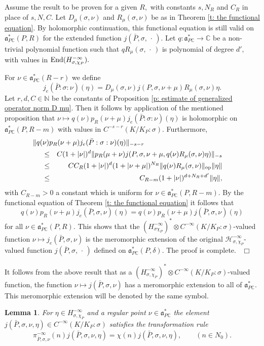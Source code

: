 \documentclass[12pt,a4paper]{article}
\newtheorem{Lemma}[Thm]{Lemma}
\newenvironment{lemma}[0]{\begin{Lemma}\noindent}%
{\end{Lemma}}
\def\qed{~\hfill\hbox{$\Box$}\medbreak}
\def\qquad{\quad\quad}
\def\msy#1{{\mathbb #1}}
\def\C{{\msy C}}
\def\N{{\msy N}}
\def\gd{\delta}
\def\gs{\sigma}
\def\got#1{\mathfrak #1}
\def\fa{{\got a}}
\def\to{\rightarrow}
\def\End{{\rm End}}
\def\iC{{\scriptscriptstyle \C}}
\def\cH{{\mathcal H}}
\numberwithin{Thm}{section}
\numberwithin{equation}{section}
\def\dotvar{\, \cdot\,}
\def\faPdc{{\fa_{P\iC}^*}}
\numberwithin{equation}{section}
\def\faPdc{\fa_{P\iC}^*}
\def\cchi{\chi}
\def\gsP{\gs}%
\begin{document}
Assume the result to be proven for a given $R,$ with constants $s, N_R$ and $C_R$ 
in place of $s, N, C.$ 
Let $D_\mu(\gs, \nu)$ and $R_\mu(\gs, \nu)$ be as in Theorem \ref{t: the functional equation}.
By holomorphic continuation, this functional equation is still valid on $\faPdc(P,R) $
for the extended function $j(\bar P, \gs, \dotvar).$ 
Let $q: \faPdc \to \C$ be a  non-trivial polynomial function such that $q R_\mu(\gs, \dotvar)$ is polynomial
of degree $d',$ with values in $\End (H_{\gs,\cchi_P}^{-\infty}).$ 

For  $\nu \in \faPdc(R - r)$ we define
$$
j_e(\bar P:\gs: \nu)(\eta) = D_\mu(\gs, \nu) j(P, \gs ,  \nu + \mu) R_{\mu}(\gs, \nu) \eta.
$$ 
Let $r,d, C \in \N$ be the constants of Proposition \ref{p: estimate of generalized operator norm D mu}. Then it follows by application
of the mentioned proposition that $\nu \mapsto  q(\nu) p_R(\nu +\mu ) j_e(\bar P:\gs: \nu)(\eta)$ 
is holomorphic on $\faPdc(P, R - m)$ with values in $C^{-s-r}(K/K_P:\gsP).$ Furthermore, 
\begin{eqnarray*}
\lefteqn{\!\!\!\!\!\!\!\!\|q(\nu) p_R(\nu + \mu) j_e(\bar P:\gs: \nu)(\eta)\|_{-s-r} } \\
& \leq &  C( 1 + |\nu|)^{d}  \| p_R(\mu + \nu) j(P,\gs, \nu + \mu, q(\nu)R_\mu(\gs, \nu)\eta)\|_{-s}\\
&\leq & C C_R (1 + |\nu|)^d ( 1 + |\nu + \mu|)^{N_R} \|q(\nu) R_\mu(\gs, \nu)\|_{\rm op} \|\eta\| \\
&\leq & C_{R-m} (1 +|\nu|)^{d + N_R + d'}\|\eta\|,
\end{eqnarray*}
with $C_{R-m} > 0$ a constant which is uniform for $\nu \in \faPdc(P, R-m).$ 
By the functional equation of Theorem \ref{t: the functional equation} it follows that
$$ 
q(\nu) p_R(\nu + \mu) j_e(\bar P,\gs, \nu)(\eta) = q(\nu) p_R(\nu + \mu) j(\bar P, \gs, \nu)(\eta)
$$ 
for all $\nu \in \faPdc(P,R).$ 
This shows that the $(H_{\gs \cchi_P}^{-\infty})^* \otimes C^{-\infty}(K/K_P:\gsP)$-valued function $\nu \mapsto j_e(\bar P, \gs, \nu)$ is the meromorphic extension of the original 
$\cH_{\gs,\cchi_P}^{-\infty}$-valued function $j(\bar P, \gs, \dotvar)$ defined on $\faPdc(P, \gd).$ 
The proof is complete.
\qed

It follows from the above result that as a  $(H_{\gs, \cchi_P}^{-\infty})^*\otimes C^{-\infty}(K/K_P: \gsP)$-valued 
function, the function $\nu \mapsto j(\bar P, \gs, \nu)$ has a meromorphic extension to all of 
$\faPdc.$ This meromorphic extension will be denoted by the same symbol.

\begin{lemma}
For $\eta \in H_{\gs,\cchi_P}^{-\infty}$ and a regular point $\nu \in \faPdc$
the element $j(\bar P, \gs, \nu, \eta) \in C^{-\infty}(K/K_P: \gsP)$ satisfies the transformation 
rule 
$$ 
\pi_{\bar P, \gs, \nu}^{-\infty} (n) j(\bar P, \gs, \nu, \eta) = \cchi(n)  j(\bar P, \gs, \nu, \eta), \qquad  (n \in N_0).
$$ 
\end{lemma}
\end{document}
